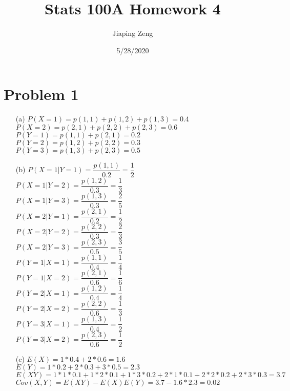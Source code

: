 \documentclass{article}
\title{Stats 100A Homework 4}
\author{Jiaping Zeng}
\date{5/28/2020}
\begin{document}
\maketitle

\section*{Problem 1}
\begin{itemize}
	\item [(a)] $P(X=1)=p(1,1)+p(1,2)+p(1,3)=\boxed{0.4}$\\$P(X=2)=p(2,1)+p(2,2)+p(2,3)=\boxed{0.6}$\\$P(Y=1)=p(1,1)+p(2,1)=\boxed{0.2}$\\$P(Y=2)=p(1,2)+p(2,2)=\boxed{0.3}$\\$P(Y=3)=p(1,3)+p(2,3)=\boxed{0.5}$
	\item [(b)] $P(X=1|Y=1)=\dfrac{p(1,1)}{0.2}=\boxed{\dfrac{1}{2}}$\\$P(X=1|Y=2)=\dfrac{p(1,2)}{0.3}=\boxed{\dfrac{1}{3}}$\\$P(X=1|Y=3)=\dfrac{p(1,3)}{0.3}=\boxed{\dfrac{2}{5}}$\\$P(X=2|Y=1)=\dfrac{p(2,1)}{0.2}=\boxed{\dfrac{1}{2}}$\\$P(X=2|Y=2)=\dfrac{p(2,2)}{0.3}=\boxed{\dfrac{2}{3}}$\\$P(X=2|Y=3)=\dfrac{p(2,3)}{0.5}=\boxed{\dfrac{3}{5}}$\\$P(Y=1|X=1)=\dfrac{p(1,1)}{0.4}=\boxed{\dfrac{1}{4}}$\\$P(Y=1|X=2)=\dfrac{p(2,1)}{0.6}=\boxed{\dfrac{1}{6}}$\\$P(Y=2|X=1)=\dfrac{p(1,2)}{0.4}=\boxed{\dfrac{1}{4}}$\\$P(Y=2|X=2)=\dfrac{p(2,2)}{0.6}=\boxed{\dfrac{1}{3}}$\\$P(Y=3|X=1)=\dfrac{p(1,3)}{0.4}=\boxed{\dfrac{1}{2}}$\\$P(Y=3|X=2)=\dfrac{p(2,3)}{0.6}=\boxed{\dfrac{1}{2}}$
	\item [(c)] $E(X)=1*0.4+2*0.6=1.6$\\$E(Y)=1*0.2+2*0.3+3*0.5=2.3$\\$E(XY)=1*1*0.1+1*2*0.1+1*3*0.2+2*1*0.1+2*2*0.2+2*3*0.3=3.7$\\$Cov(X,Y)=E(XY)-E(X)E(Y)=3.7-1.6*2.3=\boxed{0.02}$
\end{itemize}
\end{document}
